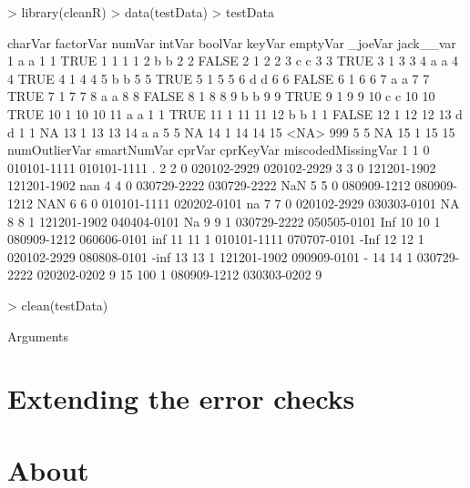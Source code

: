 \documentclass[article]{jss}
\begin{document}
\begin{Schunk}
\begin{Sinput}
> library(cleanR)
> data(testData)
> testData
\end{Sinput}
\begin{Soutput}
   charVar factorVar numVar intVar boolVar keyVar emptyVar _joeVar jack__var
1        a         a      1      1    TRUE      1        1       1         1
2        b         b      2      2   FALSE      2        1       2         2
3        c         c      3      3    TRUE      3        1       3         3
4        a         a      4      4    TRUE      4        1       4         4
5        b         b      5      5    TRUE      5        1       5         5
6        d         d      6      6   FALSE      6        1       6         6
7        a         a      7      7    TRUE      7        1       7         7
8        a         a      8      8   FALSE      8        1       8         8
9        b         b      9      9    TRUE      9        1       9         9
10       c         c     10     10    TRUE     10        1      10        10
11       a         a      1      1    TRUE     11        1      11        11
12       b         b      1      1   FALSE     12        1      12        12
13       d         d      1      1      NA     13        1      13        13
14       a         a      5      5      NA     14        1      14        14
15    <NA>       999      5      5      NA     15        1      15        15
   numOutlierVar smartNumVar      cprVar   cprKeyVar miscodedMissingVar
1              1           0 010101-1111 010101-1111                  .
2              2           0 020102-2929 020102-2929                   
3              3           0 121201-1902 121201-1902                nan
4              4           0 030729-2222 030729-2222                NaN
5              5           0 080909-1212 080909-1212                NAN
6              6           0 010101-1111 020202-0101                 na
7              7           0 020102-2929 030303-0101                 NA
8              8           1 121201-1902 040404-0101                 Na
9              9           1 030729-2222 050505-0101                Inf
10            10           1 080909-1212 060606-0101                inf
11            11           1 010101-1111 070707-0101               -Inf
12            12           1 020102-2929 080808-0101               -inf
13            13           1 121201-1902 090909-0101                  -
14            14           1 030729-2222 020202-0202                  9
15           100           1 080909-1212 030303-0202                  9
\end{Soutput}
\end{Schunk}


\begin{Schunk}
\begin{Sinput}
> clean(testData)
\end{Sinput}
\end{Schunk}


Arguments


\section{Extending the error checks}

\section[About Java]{About }
\end{document}
